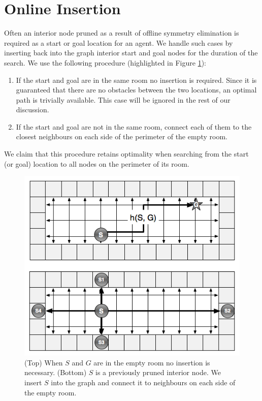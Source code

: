 \section{Online Insertion}
Often an interior node pruned as a result of offline symmetry elimination
is required as a start or goal location for an agent.
We handle such cases by inserting back into the graph interior start and goal nodes  
for the duration of the search.
We use the following procedure (highlighted in Figure \ref{fig:insertion}):
\begin{enumerate}
\item{If the start and goal are in the same room no insertion is required.
 Since it is guaranteed that there are no obstacles between the two locations, an optimal 
 path is trivially available. This case will be ignored in the rest of our discussion.}
\item{If the start and goal are not in the same room, connect each of them
to the closest neighbours on each side of the perimeter of the empty room.}
\end{enumerate}
We claim that this procedure retains optimality when searching from the start (or goal) location
to all nodes on the perimeter of its room.

\begin{figure}[t]
	\vspace{-4pt}
       \begin{center}
           \includegraphics[scale=0.50, trim = 10mm 10mm 10mm 0mm]{diagrams/roomtraversal.png}
       \end{center}
	\vspace{-3pt}
       \caption{(Top) When $S$ and $G$ are in the empty room no insertion is necessary.
				(Bottom) $S$ is a previously pruned interior node.
				We insert $S$ into the graph and connect it to neighbours on each side of the empty room.}
	\label{fig:insertion}
\end{figure}

